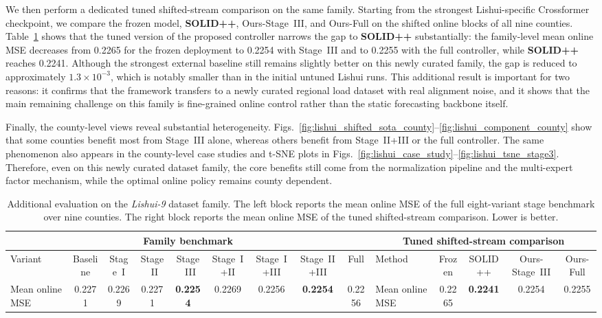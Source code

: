 ﻿\documentclass[journal]{IEEEtran}
\begin{document}
We then perform a dedicated tuned shifted-stream comparison on the same family. Starting from the strongest Lishui-specific Crossformer checkpoint, we compare the frozen model, \textbf{SOLID++}, Ours-Stage~III, and Ours-Full on the shifted online blocks of all nine counties. Table~\ref{tab:lishui_family} shows that the tuned version of the proposed controller narrows the gap to \textbf{SOLID++} substantially: the family-level mean online MSE decreases from 0.2265 for the frozen deployment to 0.2254 with Stage~III and to 0.2255 with the full controller, while \textbf{SOLID++} reaches 0.2241. Although the strongest external baseline still remains slightly better on this newly curated family, the gap is reduced to approximately $1.3\times 10^{-3}$, which is notably smaller than in the initial untuned Lishui runs. This additional result is important for two reasons: it confirms that the framework transfers to a newly curated regional load dataset with real alignment noise, and it shows that the main remaining challenge on this family is fine-grained online control rather than the static forecasting backbone itself.

Finally, the county-level views reveal substantial heterogeneity. Figs.~\ref{fig:lishui_shifted_sota_county}--\ref{fig:lishui_component_county} show that some counties benefit most from Stage~III alone, whereas others benefit from Stage~II+III or the full controller. The same phenomenon also appears in the county-level case studies and t-SNE plots in Figs.~\ref{fig:lishui_case_study}--\ref{fig:lishui_tsne_stage3}. Therefore, even on this newly curated dataset family, the core benefits still come from the normalization pipeline and the multi-expert factor mechanism, while the optimal online policy remains county dependent.

\begin{table}[t]
\caption{Additional evaluation on the \textit{Lishui-9} dataset family. The left block reports the mean online MSE of the full eight-variant stage benchmark over nine counties. The right block reports the mean online MSE of the tuned shifted-stream comparison. Lower is better.}
\label{tab:lishui_family}
\centering
\scriptsize
\setlength{\tabcolsep}{4pt}
\begin{tabular}{lcccccccc|lcccc}
\toprule
\multicolumn{9}{c|}{Family benchmark} & \multicolumn{5}{c}{Tuned shifted-stream comparison} \\
\midrule
Variant & Baseline & Stage~I & Stage~II & Stage~III & Stage~I+II & Stage~I+III & Stage~II+III & Full & Method & Frozen & SOLID++ & Ours-Stage~III & Ours-Full \\
\midrule
Mean online MSE & 0.2271 & 0.2269 & 0.2271 & \textbf{0.2254} & 0.2269 & 0.2256 & \textbf{0.2254} & 0.2256 & Mean online MSE & 0.2265 & \textbf{0.2241} & 0.2254 & 0.2255 \\
\bottomrule
\end{tabular}
\end{table}
\end{document}
